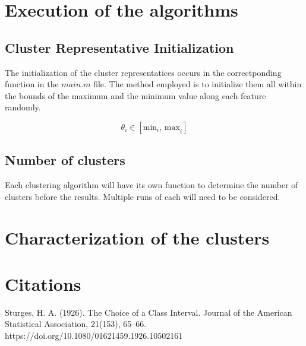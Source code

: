 \documentclass[12pt, a4paper]{article}
\begin{document}
\section{Execution of the algorithms}

\subsection{Cluster Representative Initialization}

The initialization of the cluster representatices occurs in the correctponding function in the $main.m$ file. The method employed is to initialize them all within the bounds of the maximum and the minimum value along each feature randomly.

\[\theta_i \in \left[\text{min}_i \text{, max}_i\right]\]

\subsection{Number of clusters}

Each clustering algorithm will have its own function to determine the number of clusters before the results. Multiple runs of each will need to be considered.

\section{Characterization of the clusters}

\section{Citations}

Sturges, H. A. (1926). The Choice of a Class Interval. Journal of the American Statistical Association, 21(153), 65–66. https://doi.org/10.1080/01621459.1926.10502161
\newline
\end{document}
